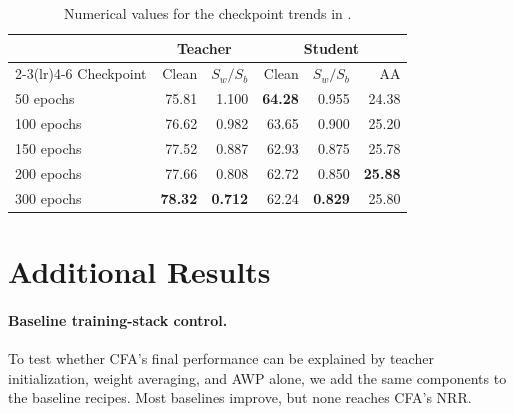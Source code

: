 \begin{table}[!htbp]
  \centering \small \setlength{\tabcolsep}{4pt}
  \caption{Numerical values for the checkpoint trends in .}
  \label{tab:teacherladder_values}
  \begin{tabular}{lrrrrr}
    \toprule
    & \multicolumn{2}{c}{Teacher} & \multicolumn{3}{c}{Student} \\
    \cmidrule(lr){2-3}\cmidrule(lr){4-6}
    Checkpoint & Clean & $S_w/S_b$ & Clean & $S_w/S_b$ & AA \\
    \midrule
    50 epochs  & 75.81 & 1.100 & \textbf{64.28} & 0.955 & 24.38 \\
    100 epochs & 76.62 & 0.982 & 63.65 & 0.900 & 25.20 \\
    150 epochs & 77.52 & 0.887 & 62.93 & 0.875 & 25.78 \\
    200 epochs & 77.66 & 0.808 & 62.72 & 0.850 & \textbf{25.88} \\
    300 epochs & \textbf{78.32} & \textbf{0.712} & 62.24 & \textbf{0.829} & 25.80 \\
    \bottomrule
  \end{tabular}
\end{table}

\section{Additional Results}

\paragraph{Baseline training-stack control.}
To test whether CFA's final performance can be explained by teacher
initialization, weight averaging, and AWP alone, we add the same components to
the baseline recipes. Most baselines improve, but none reaches CFA's NRR.

